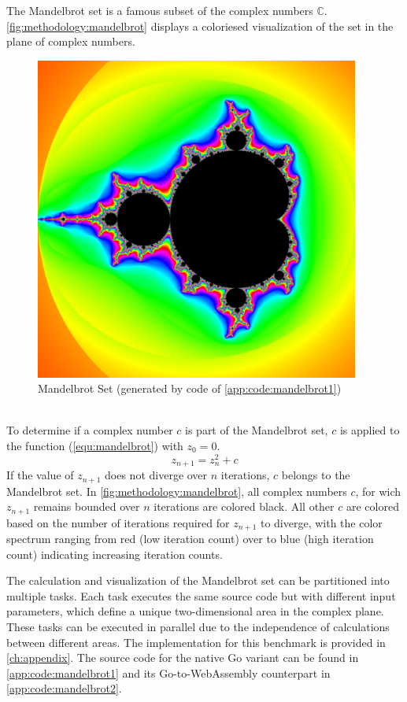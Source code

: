 The Mandelbrot set is a famous subset of the complex numbers $\mathbb{C}$. \autoref{fig:methodology:mandelbrot} displays a coloriesed visualization of the set in the plane of complex numbers.
\begin{figure}[htbp]
  \centering
  \includegraphics[width=0.95\textwidth]{gfx/figures/mandelbrot.png}
  \caption{Mandelbrot Set (generated by code of \ref{app:code:mandelbrot1})}
  \label{fig:methodology:mandelbrot}
\end{figure}
~\\
To determine if a complex number $c$ is part of the Mandelbrot set, $c$ is applied to the function (\ref{equ:mandelbrot}) with $z_{0}=0$.
\begin{equation}
  z_{n+1} = z_{n}^2 + c
  \label{equ:mandelbrot}
\end{equation}
If the value of $z_{n+1}$ does not diverge over $n$ iterations, $c$ belongs to the Mandelbrot set. In \autoref{fig:methodology:mandelbrot}, all complex numbers $c$, for wich $z_{n+1}$ remains bounded over $n$ iterations are colored black. All other $c$ are colored based on the number of iterations required for $z_{n+1}$ to diverge, with the color spectrum ranging from red (low iteration count) over to blue (high iteration count) indicating increasing iteration counts.

The calculation and visualization of the Mandelbrot set can be partitioned into multiple tasks. Each task executes the same source code but with different input parameters, which define a unique two-dimensional area in the complex plane. These tasks can be executed in parallel due to the independence of calculations between different areas. The implementation for this benchmark is provided in \autoref{ch:appendix}. The source code for the native Go variant can be found in \autoref{app:code:mandelbrot1} and its Go-to-WebAssembly counterpart in \autoref{app:code:mandelbrot2}.